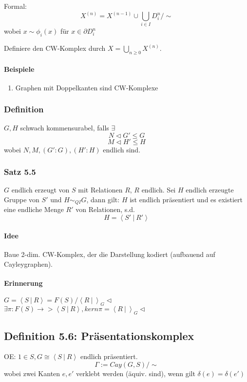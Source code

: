 \documentclass{article}
\newcommand{\grp}[2]{\left\langle #1~|~#2 \right\rangle}
\begin{document}
Formal:
\[X^{(n)} = X^{(n-1)} \cup \bigcup_{i\in I}D^n_i/\sim \]
wobei $x\sim \phi_i(x)$ für $x \in \partial D_i^n$

Definiere den CW-Komplex durch $X = \bigcup_{n\geq 0} X^{(n)}$.

\paragraph{Beispiele}
\begin{enumerate}
	\item Graphen mit Doppelkanten sind CW-Komplexe
\end{enumerate}


\subsubsection{Definition}
$G,H$ schwach kommensurabel, falls $\exists$
\[N \vartriangleleft G' \leq G\]
\[M \vartriangleleft H' \leq H\]
wobei $N,M, (G':G), (H':H)$ endlich sind.

\subsubsection{Satz 5.5}
$G$ endlich erzeugt von $S$ mit Relationen $R$, $R$ endlich. Sei $H$ endlich erzeugte Gruppe von $S'$ und $H\sim_{QI}G$, dann gilt:
$H$ ist endlich präsentiert und es existiert eine endliche Menge $R'$ von Relationen, s.d.
\[H = \grp{S'}{R'}\]
\paragraph{Idee}
Baue 2-dim. CW-Komplex, der die Darstellung kodiert (aufbauend auf Cayleygraphen).
\paragraph{Erinnerung}
$G = \grp{S}{R} = F(S)/ \grp{R}{}_G\vartriangleleft$\\
$\exists \pi: F(S) \rightarrow > \grp{S}{R}, kern \pi = \grp{R}{}_G\vartriangleleft$ 

\subsection{Definition 5.6: Präsentationskomplex}
OE: $1 \in S, G \cong \grp{S}{R}$ endlich präsentiert.
\[\Gamma := Cay(G,S)/\sim \]
wobei zwei Kanten $e, e'$ verklebt werden (äquiv. sind), wenn gilt $\delta(e) = \delta(e')$\\\\
\end{document}
